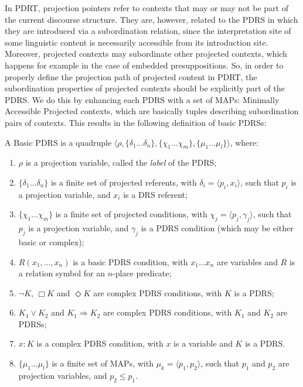 In PDRT, projection pointers refer to contexts that may or may not be part
of the current discourse structure. They are, however, related to the PDRS
in which they are introduced via a subordination relation, since the
interpretation site of some linguistic content is necessarily accessible
from its introduction site. Moreover, projected contexts may subordinate
other projected contexts, which happens for example in the case of embedded
presuppositions. So, in order to properly define the projection path of
projected content in PDRT, the subordination properties of projected
contexts should be explicitly part of the PDRS. We do this by enhancing each
PDRS with a set of MAPs: Minimally Accessible Projected contexts, which are
basically tuples describing subordination pairs of contexts. This results in
the following definition of basic PDRSs:

\begin{definition} \label{def:bPDRS}
A Basic PDRS is a quadruple $\langle \rho, \{\delta_1 ... \delta_n\},
  \{\chi_1 ... \chi_m\}, \{\mu_1 ... \mu_l\}\rangle$, where:
  \begin{enumerate}[i]
    \item $\rho$ is a projection variable, called the \textit{label} of the
      PDRS;
    \item $\{\delta_1 ... \delta_n\}$ is a finite set of projected
      referents, with $\delta_i=\langle p_i, x_i\rangle$, such that $p_i$ is
      a projection variable, and $x_i$ is a DRS referent;
    \item $\{\chi_1 ... \chi_m\}$ is a finite set of projected conditions,
      with $\chi_j = \langle p_j,\gamma_j\rangle$, such that $p_j$ is a
      projection variable, and $\gamma_j$ is a PDRS condition (which may be
      either basic or complex);
    \item \label{def:bPDRS:Rel} $R(x_1, ..., x_n)$ is a basic PDRS condition,
      with $x_1 ... x_n$ are variables and $R$ is a relation symbol for an
      $n$-place predicate;
    \item $\neg K$, $\Box K$ and $\Diamond K$ are complex PDRS conditions,
      with $K$ is a PDRS;
    \item $K_1 \vee K_2$ and $K_1 \Rightarrow K_2$ are complex PDRS
      conditions, with $K_1$ and $K_2$ are PDRSs;
    \item\label{def:bPDRS:Prop} $x:K$ is a complex PDRS condition, with $x$
      is a variable and $K$ is a PDRS.
    \item $\{\mu_1 ... \mu_l\}$ is a finite set of MAPs, with $\mu_k=\langle
      p_1,p_2\rangle$, such that $p_1$ and $p_2$ are projection variables,
      and $p_2\leq p_1$.

  \end{enumerate}
\end{definition}

